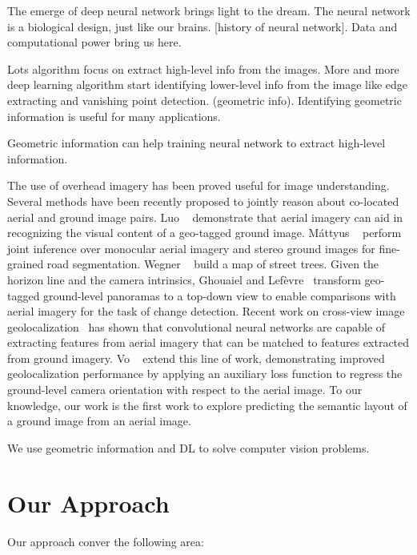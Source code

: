 The emerge of deep neural network brings light to the dream. The
neural network is a biological design, just like our brains. [history
of neural network]. Data and computational power bring us here.

Lots algorithm focus on extract high-level info from the images. More
and more deep learning algorithm start identifying lower-level info
from the image like edge extracting and vanishing point detection.
(geometric info). Identifying geometric information is useful for many
applications.

Geometric information can help training neural network to extract
high-level information.

The use of overhead imagery has been proved useful for image
understanding.
Several methods have been recently proposed to jointly reason about
co-located aerial and ground image pairs. Luo
\etal~\cite{luo2008event} demonstrate that aerial imagery can aid
in recognizing the visual content of a geo-tagged ground image.
M{\'a}ttyus \etal~\cite{mattyus2016hd} perform joint inference over
monocular aerial imagery and stereo ground images for fine-grained
road segmentation. Wegner \etal~\cite{wegner2016cataloging} build a
map of street trees. Given the horizon line and the camera intrinsics,
Ghouaiel and Lef{\`e}vre~\cite{ghouaiel2016coupling} transform
geo-tagged ground-level panoramas to a top-down view to enable
comparisons with aerial imagery for the task of change detection.
Recent work on cross-view image
geolocalization~\cite{lin2013cross,lin2015learning,workman2015geocnn,workman2015wide}
 has shown that convolutional neural
networks are capable of extracting features from aerial imagery
that can be matched to features extracted from ground imagery.
Vo \etal~\cite{vo2016localizing} extend this line of work,
demonstrating improved geolocalization performance by applying an
auxiliary loss function to regress the ground-level camera orientation
with respect to the aerial image. To our knowledge, our work is the
first work to explore predicting the semantic layout of a ground
image from an aerial image.


We use geometric information and DL to solve computer vision problems.


\section{Our Approach}
Our approach conver the following area:

